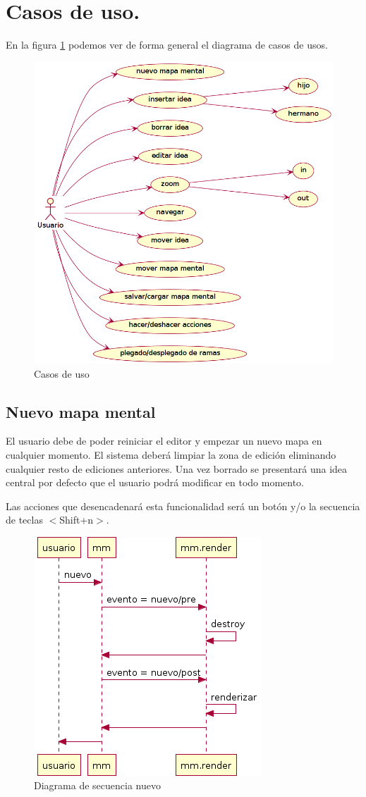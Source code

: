 \section{Casos de uso.}

En la figura \ref{fig:casosdeuso} podemos ver de forma general el diagrama de casos de usos.

\begin{figure}[htbp]
\centering
\includegraphics[width=\textwidth]{imagenes/casos-de-uso}
\caption{Casos de uso}
\label{fig:casosdeuso}
\end{figure}

\subsection{Nuevo mapa mental}
El usuario debe de poder reiniciar el editor y empezar un nuevo mapa en cualquier momento. El sistema deberá limpiar la zona de edición eliminando cualquier resto de ediciones anteriores. Una vez borrado se presentará una idea central por defecto que el usuario podrá modificar en todo momento. 

Las acciones que desencadenará esta funcionalidad será un botón y/o la secuencia de teclas $<$Shift+n$>$.

\begin{figure}[tbph]
\centering
\includegraphics[width=0.4\linewidth]{imagenes/diagrama-seq-nuevo}
\caption{Diagrama de secuencia nuevo}
\label{fig:diagrama-seq-nuevo}
\end{figure}


